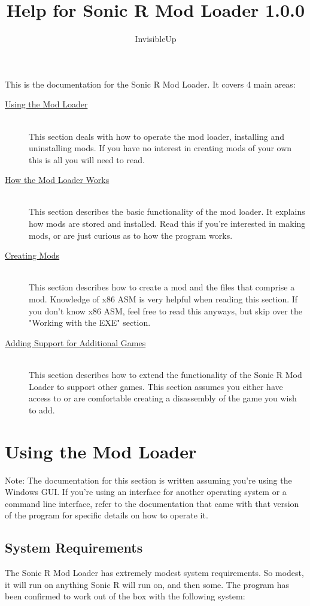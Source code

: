 \documentclass[12pt,a4paper,notitlepage]{article}
\title{Help for Sonic R Mod Loader 1.0.0}
\author{InvisibleUp}
\begin{document}
\maketitle
This is the documentation for the Sonic R Mod Loader. It covers 4 main areas:
\begin{description}
\item[{\hyperref[sec:using]{Using the Mod Loader}}] \hfill \\ 
	This section deals with how to operate the mod loader, installing and uninstalling mods. If you have no interest in creating mods of your own this is all you will need to read.
\item[{\hyperref[sec:works]{How the Mod Loader Works}}] \hfill \\
	This section describes the basic functionality of the mod loader. It explains how mods are stored and installed. Read this if you're interested in making mods, or are just curious as to how the program works.
\item[{\hyperref[sec:create]{Creating Mods}}] \hfill \\
	This section describes how to create a mod and the files that comprise a mod. Knowledge of x86 ASM is very helpful when reading this section. If you don't know x86 ASM, feel free to read this anyways, but skip over the "Working with the EXE" section.
\item[{\hyperref[sec:games]{Adding Support for Additional Games}}] \hfill \\
	This section describes how to extend the functionality of the Sonic R Mod Loader to support other games. This section assumes you either have access to or are comfortable creating a disassembly of the game you wish to add.
\end{description} 

\pagebreak
\section{Using the Mod Loader}
\label{sec:using}
Note: The documentation for this section is written assuming you're using the Windows GUI. If you're using an interface for another operating system or a command line interface, refer to the documentation that came with that version of the program for specific details on how to operate it.

\subsection{System Requirements}
The Sonic R Mod Loader has extremely modest system requirements. So modest, it will run on anything Sonic R will run on, and then some. The program has been confirmed to work out of the box with the following system:
\end{document}
